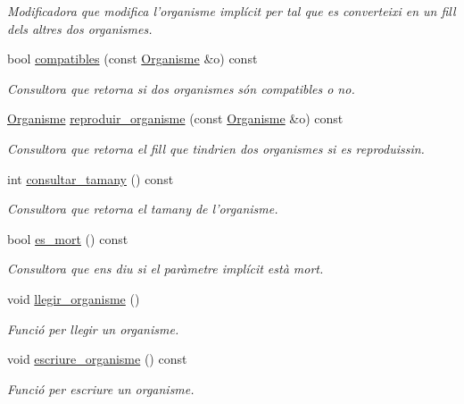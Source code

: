 \begin{DoxyCompactItemize}
\begin{DoxyCompactList}\small\item\em Modificadora que modifica l'organisme implícit per tal que es converteixi en un fill dels altres dos organismes. \end{DoxyCompactList}\item 
bool \hyperlink{class_organisme_a4706d097ab7348c9161cc8f8a5052418}{compatibles} (const \hyperlink{class_organisme}{Organisme} \&o) const 
\begin{DoxyCompactList}\small\item\em Consultora que retorna si dos organismes són compatibles o no. \end{DoxyCompactList}\item 
\hyperlink{class_organisme}{Organisme} \hyperlink{class_organisme_a82d843de079550e169f5d479ec21619f}{reproduir\-\_\-organisme} (const \hyperlink{class_organisme}{Organisme} \&o) const 
\begin{DoxyCompactList}\small\item\em Consultora que retorna el fill que tindrien dos organismes si es reproduissin. \end{DoxyCompactList}\item 
int \hyperlink{class_organisme_a2232a1a2596db03697e6345fff587621}{consultar\-\_\-tamany} () const 
\begin{DoxyCompactList}\small\item\em Consultora que retorna el tamany de l'organisme. \end{DoxyCompactList}\item 
bool \hyperlink{class_organisme_abe3c4923cc5641e48724312bc298c8a9}{es\-\_\-mort} () const 
\begin{DoxyCompactList}\small\item\em Consultora que ens diu si el paràmetre implícit està mort. \end{DoxyCompactList}\item 
void \hyperlink{class_organisme_a056a9402130c7081b608838ba9ef2a30}{llegir\-\_\-organisme} ()
\begin{DoxyCompactList}\small\item\em Funció per llegir un organisme. \end{DoxyCompactList}\item 
void \hyperlink{class_organisme_ab359a3109ec7ff96018bbe08d97043cf}{escriure\-\_\-organisme} () const 
\begin{DoxyCompactList}\small\item\em Funció per escriure un organisme. \end{DoxyCompactList}\end{DoxyCompactItemize}
